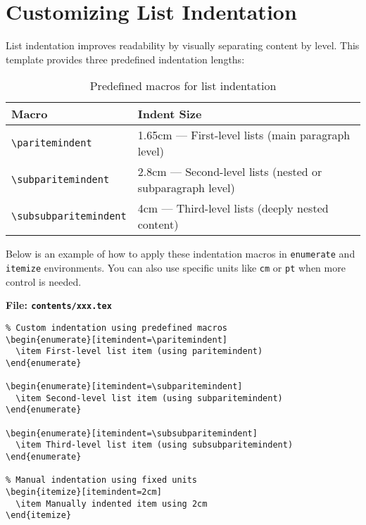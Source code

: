 \documentclass{VISTEC}
\begin{document}
\section{Customizing List Indentation}
\label{manual:indentation}

\begin{paragraph}
List indentation improves readability by visually separating content by level. This template provides three predefined indentation lengths:
\end{paragraph}

\begin{table}[ht]
\small\singlespacingplus
\centering
\caption{Predefined macros for list indentation}
\begin{tabular}{ll}
\toprule
\textbf{Macro} & \textbf{Indent Size} \\
\midrule
\verb|\paritemindent| & 1.65cm — First-level lists (main paragraph level) \\
\verb|\subparitemindent| & 2.8cm — Second-level lists (nested or subparagraph level) \\
\verb|\subsubparitemindent| & 4cm — Third-level lists (deeply nested content) \\
\bottomrule
\end{tabular}
\end{table}

\begin{paragraph}
Below is an example of how to apply these indentation macros in \texttt{enumerate} and \texttt{itemize} environments. You can also use specific units like \texttt{cm} or \texttt{pt} when more control is needed.
\end{paragraph}
\newpage

\noindent\textbf{File: \texttt{contents/xxx.tex}}\vspace{-1.5em}
\begin{verbatim}
% Custom indentation using predefined macros
\begin{enumerate}[itemindent=\paritemindent]
  \item First-level list item (using paritemindent)
\end{enumerate}

\begin{enumerate}[itemindent=\subparitemindent]
  \item Second-level list item (using subparitemindent)
\end{enumerate}

\begin{enumerate}[itemindent=\subsubparitemindent]
  \item Third-level list item (using subsubparitemindent)
\end{enumerate}

% Manual indentation using fixed units
\begin{itemize}[itemindent=2cm]
  \item Manually indented item using 2cm
\end{itemize}

\end{verbatim}
\end{document}
